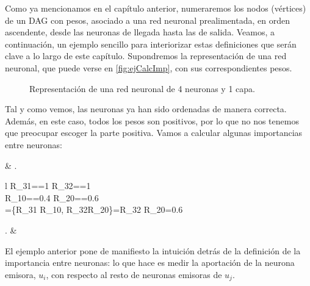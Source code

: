 \documentclass[12pt, a4paper, twoside]{book}
\numberwithin{equation}{section}
\theoremstyle{definition}
\newenvironment{ejem}
  {\pushQED{\qed}\renewcommand{\qedsymbol}{$\blacktriangleleft$}\ejemplo}
  {\popQED\endejemplo}
\theoremstyle{remark}
\theoremstyle{plain}
\begin{document}
	Como ya mencionamos en el capítulo anterior, numeraremos los nodos 
	(vértices) de un DAG con pesos, asociado a una red neuronal 
	prealimentada, en orden ascendente, desde las neuronas de llegada 
	hasta las de salida. Veamos, a continuación, un ejemplo sencillo para 
	interiorizar estas definiciones que serán clave a lo largo de este 
	capítulo.
	\begin{ejem}
		\label{ej:primerRel}	
		Supondremos la representación de una red neuronal, que puede 
		verse en \autoref{fig:ejCalcImp}, con sus correspondientes 
		pesos.

		\begin{figure}[!htbp]
			\centering
			\caption{Representación de una red neuronal de 4 neuronas y 1 capa.}
			\label{fig:ejCalcImp}
		\end{figure}
		
		Tal y como vemos, las neuronas ya han sido ordenadas de manera 
		correcta. Además, en este caso, todos los pesos son positivos, 
		por lo que no nos tenemos que preocupar escoger la parte 
		positiva. Vamos a calcular algunas importancias entre 
		neuronas:			
		\begin{flalign*}
			& \left.
				\begin{array}{l}
					R_{31}==1 \hspace{0.5cm} R_{32}==1 \\[3pt]
					R_{10}==0.4 \hspace{0.55cm}  R_{20}==0.6 \\[3pt]
					=\{R_{31} \cdot R_{10}, R_{32}\cdot R_{20}\}=R_{32} \cdot R_{20}=0.6  
				\end{array}
			\right. & 
		\end{flalign*}
	\end{ejem}
	El ejemplo anterior pone de manifiesto la intuición detrás de la 
	definición de la importancia entre neuronas: lo que hace es medir 
	la aportación de la neurona emisora, $u_{i}$, con respecto al resto de 
	neuronas emisoras de $u_{j}$.
	
\end{document}
